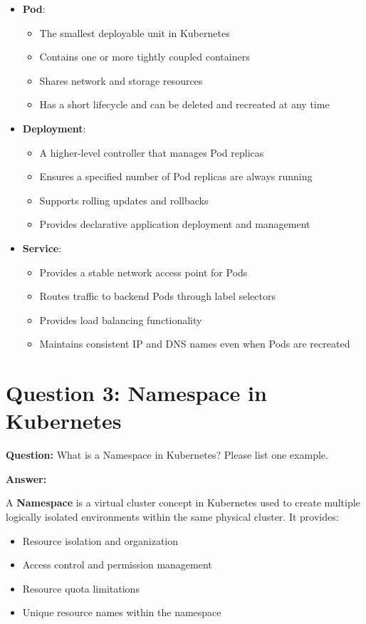 \documentclass[12pt,a4paper]{article}
\begin{document}
\begin{itemize}
    \item \textbf{Pod}:
    \begin{itemize}
        \item The smallest deployable unit in Kubernetes
        \item Contains one or more tightly coupled containers
        \item Shares network and storage resources
        \item Has a short lifecycle and can be deleted and recreated at any time
    \end{itemize}
    
    \item \textbf{Deployment}:
    \begin{itemize}
        \item A higher-level controller that manages Pod replicas
        \item Ensures a specified number of Pod replicas are always running
        \item Supports rolling updates and rollbacks
        \item Provides declarative application deployment and management
    \end{itemize}
    
    \item \textbf{Service}:
    \begin{itemize}
        \item Provides a stable network access point for Pods
        \item Routes traffic to backend Pods through label selectors
        \item Provides load balancing functionality
        \item Maintains consistent IP and DNS names even when Pods are recreated
    \end{itemize}
\end{itemize}

\section{Question 3: Namespace in Kubernetes}

\textbf{Question:} What is a Namespace in Kubernetes? Please list one example.

\textbf{Answer:}

A \textbf{Namespace} is a virtual cluster concept in Kubernetes used to create multiple logically isolated environments within the same physical cluster. It provides:
\begin{itemize}
    \item Resource isolation and organization
    \item Access control and permission management
    \item Resource quota limitations
    \item Unique resource names within the namespace
\end{itemize}
\end{document}
